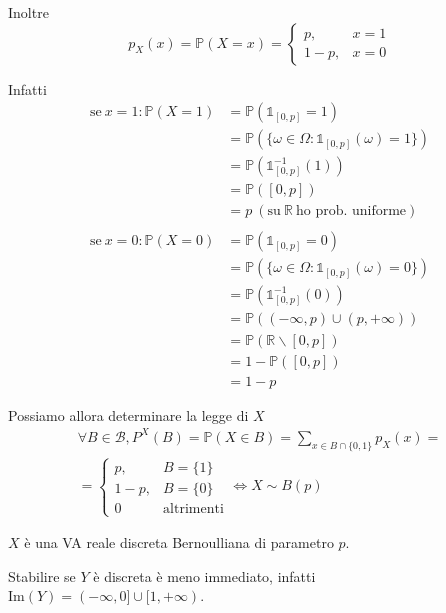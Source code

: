 \begin{enumerate}
Inoltre\begin{equation*}
p_{X}( x) =\mathbb{P}( X=x) =\begin{cases}
p, & x=1\\
1-p, & x=0
\end{cases}
\end{equation*}

Infatti\begin{equation*}
\begin{aligned}
\text{se} \ x=1:\mathbb{P}( X=1) & =\mathbb{P}(\mathbb{1}_{[ 0,p]} =1)\\
 & =\mathbb{P}(\{\omega \in \Omega :\mathbb{1}_{[ 0,p]}( \omega ) =1\})\\
 & =\mathbb{P}\left(\mathbb{1}_{[ 0,p]}^{-1}( 1)\right)\\
 & =\mathbb{P}([ 0,p])\\
 & =p\ \left(\text{su} \ \mathbb{R} \ \text{ho prob. uniforme}\right)\\
 & \\
\text{se} \ x=0:\mathbb{P}( X=0) & =\mathbb{P}(\mathbb{1}_{[ 0,p]} =0)\\
 & =\mathbb{P}(\{\omega \in \Omega :\mathbb{1}_{[ 0,p]}( \omega ) =0\})\\
 & =\mathbb{P}\left(\mathbb{1}_{[ 0,p]}^{-1}( 0)\right)\\
 & =\mathbb{P}(( -\infty ,p) \cup ( p,+\infty ))\\
 & =\mathbb{P}(\mathbb{R} \smallsetminus [ 0,p])\\
 & =1-\mathbb{P}([ 0,p])\\
 & =1-p
\end{aligned}
\end{equation*}

Possiamo allora determinare la legge di $X$\begin{gather*}
\forall B\in \mathcal{B} ,P^{X}( B) =\mathbb{P}( X\in B) =\sum\limits _{x\in B\cap \{0,1\}} p_{X}( x) =\\
=\begin{cases}
p, & B=\{1\}\\
1-p, & B=\{0\}\\
0 & \text{altrimenti}
\end{cases} \iff \boxed{X\sim B( p)}
\end{gather*}

$X$ è una VA reale discreta Bernoulliana di parametro $p$.

Stabilire se $Y$ è discreta è meno immediato, infatti $\mathrm{Im}( Y) =( -\infty ,0] \cup [ 1,+\infty )$.


\end{enumerate}
